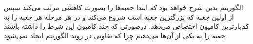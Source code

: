 \documentclass[]{article}
\begin{document}
الگوریتم بدین شرح خواهد بود که ابتدا جعبه‌ها را بصورت کاهشی مرتب می‌کند
سپس از اولین جعبه که بزرگترین جعبه است شروع می‌کند و در هر مرحله هر جعبه را
به کم‌بار‌ترین کامیون اختصاص می‌دهد. درصورتی که چند کامیون این شرط را داشته باشند
جعبه را به یکی از آن‌ها می‌دهیم چرا که تفاوتی در روند الگوریتم ایجاد نمی‌شود.
\end{document}
